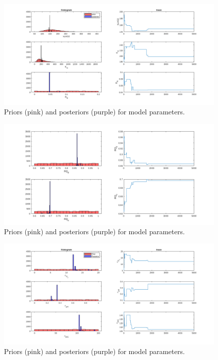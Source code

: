 \documentclass{ruthesis}
\begin{document}
\begin{figure}
	\centerline{\includegraphics[width=1.3\textwidth]{images_microalgae/plots_test/model_parameters1}}
	\caption[.]{Priors (pink) and posteriors (purple) for model parameters.}
	\label{fig:micro_exp_test_parameters_model1}
\end{figure}

\begin{figure}
	\centerline{\includegraphics[width=1.3\textwidth]{images_microalgae/plots_test/model_parameters2}}
	\caption[.]{Priors (pink) and posteriors (purple) for model parameters.}
	\label{fig:micro_exp_test_parameters_model2}
\end{figure}

\begin{figure}
	\centerline{\includegraphics[width=1.3\textwidth]{images_microalgae/plots_test/model_parameters3}}
	\caption[.]{Priors (pink) and posteriors (purple) for model parameters.}
	\label{fig:micro_exp_test_parameters_model3}
\end{figure}
\end{document}
